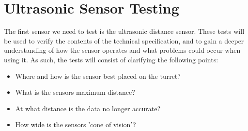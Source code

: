 \section{Ultrasonic Sensor Testing}\label{SensorTest}
The first sensor we need to test is the ultrasonic distance sensor. These tests
will be used to verify the contents of the technical specification, and
to gain a deeper understanding of how the sensor operates and what
problems could occur when using it. As such, the tests will consist of
clarifying the following points:
\begin{itemize}
  \item Where and how is the sensor best placed on the turret?
  \item What is the sensors maximum distance?
  \item At what distance is the data no longer accurate?
  \item How wide is the sensors 'cone of vision'?
\end{itemize}

%

%



